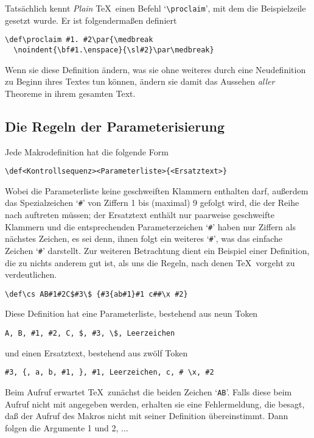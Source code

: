 Tats\"achlich kennt {\em Plain} \TeX\ einen Befehl
`\verb|\proclaim|', mit dem
die Beispielzeile gesetzt wurde. Er ist folgenderma\ss{}en definiert
\begin{verbatim}
\def\proclaim #1. #2\par{\medbreak
  \noindent{\bf#1.\enspace}{\sl#2}\par\medbreak}
\end{verbatim}
Wenn sie diese Definition \"andern, was sie ohne weiteres durch eine
Neudefinition zu Beginn ihres Textes tun k\"onnen, \"andern sie damit das
Aussehen {\em aller} Theoreme in ihrem gesamten Text.
\subsection{Die Regeln der Parameterisierung}
Jede Makrodefinition hat die folgende Form
\begin{verbatim}
\def<Kontrollsequenz><Parameterliste>{<Ersatztext>}
\end{verbatim}
Wobei die Parameterliste keine geschweiften
Klammern enthalten darf,
au\ss{}erdem das 
Spezialzeichen `\verb|#|' von Ziffern 1 bis (maximal) 9
gefolgt wird, die der Reihe nach auftreten m\"ussen; der Ersatztext
enth\"alt nur paarweise geschweifte Klammern und die entsprechenden
Parameterzeichen `\verb|#|' haben nur Ziffern als n\"achstes Zeichen, es
sei denn, ihnen folgt ein weiteres `\verb|#|', was das einfache
Zeichen `\verb|#|' darstellt. Zur weiteren Betrachtung dient ein
Beispiel einer Definition, die zu nichts anderem gut ist, als uns die
Regeln, nach denen \TeX\ vorgeht zu verdeutlichen.
\begin{verbatim}
\def\cs AB#1#2C$#3\$ {#3{ab#1}#1 c##\x #2}
\end{verbatim}
Diese Definition hat eine Parameterliste, bestehend aus neun Token
\begin{verbatim}
A, B, #1, #2, C, $, #3, \$, Leerzeichen
\end{verbatim}
und einen Ersatztext, bestehend aus zw\"olf Token
\begin{verbatim}
#3, {, a, b, #1, }, #1, Leerzeichen, c, # \x, #2
\end{verbatim}
Beim Aufruf erwartet \TeX\ zun\"achst die beiden Zeichen `\verb|AB|'.
Falls diese beim Aufruf nicht mit angegeben werden, erhalten sie eine
Fehlermeldung, die besagt, da\ss{} der Aufruf des Makros nicht mit seiner
Definition \"ubereinstimmt. Dann folgen die Argumente 1 und 2, $\ldots$

